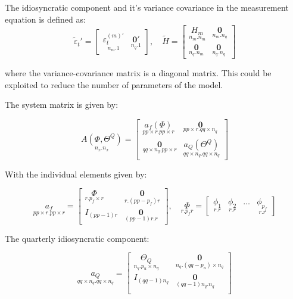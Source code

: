 \documentclass[12pt]{article}
\begin{document}
\begin{appendices}
The idiosyncratic component and it's variance covariance in the measurement equation is defined as:
\begin{equation*}
\tilde{\varepsilon}_{t}' = 
\begin{bmatrix}
\underset{n_{m}.1}{\varepsilon^{(m)'}_{t}} &
\underset{n_{q}.1}{\textbf{0}'}
\end{bmatrix},
\quad
\widetilde{H} = 
\begin{bmatrix}
\underset{n_{m}.n_{m}}{H_{m}} 	&  \underset{n_{m}.n_{q}}{\textbf{0}} \\
\underset{n_{q}.n_{m}}{\textbf{0}} 	& \underset{n_{q}.n_{q}}{\textbf{0}}
\end{bmatrix}
\end{equation*}

where the variance-covariance matrix is a diagonal matrix.
This could be exploited to reduce the number of parameters of the model.


The system matrix is given by:

\begin{equation}
\underset{n_{x}.n_{x}}{A(\Phi, \Theta^{Q})} = 
\begin{bmatrix}
\underset{pp \times r. pp \times r}{a_{f}(\Phi)} 
& \underset{pp \times r. qq \times n_{q}}{\textbf{0}}\\
\underset{qq \times n_{q}.pp \times r}{\textbf{0} }	  
& \underset{qq\times n_{q}.qq \times n_{q}}{a_{Q} \left( \Theta^{Q} \right)}
\end{bmatrix}
\end{equation}

With the individual elements given by:

\begin{equation*}
\underset{pp\times r.pp \times r}{a_{f}} =
\begin{bmatrix}
\underset{r.p_{f}\times r}{\Phi} &
\underset{r.(pp-p_{f})r}{\textbf{0}} \\
I_{(pp - 1)r} &
\underset{(pp - 1)r.r}{\textbf{0}}
\end{bmatrix}
, \quad
\underset{r.p_{f}r}{\Phi} =
\begin{bmatrix}
\underset{r.r}{\phi_{1}} 
& \underset{r.r}{\phi_{2}} 
& \dots 
& \underset{r.r}{\phi_{p_{f}} }
\end{bmatrix}
\end{equation*}


The quarterly idiosyncratic component:

\begin{equation*}
\underset{qq \times n_{q}. qq \times n_{q}}{a_{Q}} =
\begin{bmatrix}
\underset{n_{q}.p_{u}\times n_{q}}{\Theta_{Q}} 	&
\underset{n_{q}.(qq - p_{u}) \times n_{q}}{\textbf{0}}\\
I_{(qq - 1) n_{q}}  & 
\underset{(qq - 1) n_{q} . n_{q}}{\textbf{0}}\\
\end{bmatrix}
\end{equation*}



\end{appendices}
\end{document}
